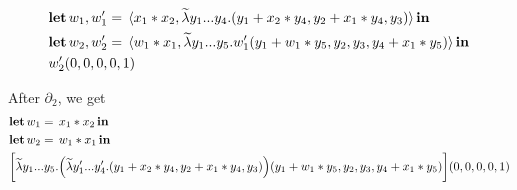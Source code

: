 \begin{example}
\begin{align*}
		&\letin{w_1,w_1'}{\tPair{\var_1 * \var_2}{\inllambda \var[2]_1...\var[2]_4.(\var[2]_1+\var_2*\var[2]_4,\var[2]_2+\var_1*\var[2]_4,\var[2]_3)} }{
		\\
		&\letin{w_2,w_2'}{\tPair{w_1 * \var_1}{\inllambda \var[2]_1...\var[2]_5.w_1'(\var[2]_1+w_1 * \var[2]_5,\var[2]_2,\var[2]_3,\var[2]_4+ \var_1 * \var[2]_5)}}{\\ 
		& w_2'(0,0,0,0,1)}}
	\end{align*}

After $\partial_2$, we get
	\begin{align*}
		&\letin{w_1}{\var_1 * \var_2}{\\
		&\letin{w_2}{w_1 * \var_1}{\\
		&\bigg[\inllambda \var[2]_1...\var[2]_5.\Big(\inllambda \var[2]_1'...\var[2]_4'.(\var[2]_1+\var_2*\var[2]_4,\var[2]_2+\var_1*\var[2]_4,\var[2]_3)\Big)(\var[2]_1+w_1 * \var[2]_5,\var[2]_2,\var[2]_3,\var[2]_4+ \var_1 * \var[2]_5)\bigg](0,0,0,0,1)
		}
		}
	\end{align*}


\end{example}

